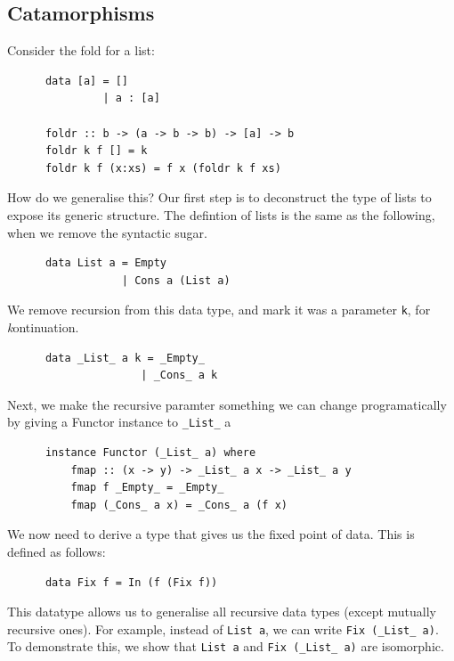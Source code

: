 \documentclass[a4paper,12pt]{article}
\theoremstyle{remark}
\begin{document}
  \subsection{Catamorphisms}

  Consider the fold for a list:

  \begin{lstlisting}
      data [a] = []
               | a : [a]

      foldr :: b -> (a -> b -> b) -> [a] -> b
      foldr k f [] = k
      foldr k f (x:xs) = f x (foldr k f xs)  \end{lstlisting}

  How do we generalise this? Our first step is to deconstruct the type of lists to expose its generic structure.
  The defintion of lists is the same as the following, when we remove the syntactic sugar.

  \begin{lstlisting}
      data List a = Empty
                  | Cons a (List a)  \end{lstlisting}

  We remove recursion from this data type, and mark it was a parameter \lstinline{k},
  for \textit{k}ontinuation.

  \begin{lstlisting}
      data _List_ a k = _Empty_
                     | _Cons_ a k  \end{lstlisting}

  Next, we make the recursive paramter something we can change programatically by
  giving a Functor instance to \lstinline{_List_} a

  \begin{lstlisting}
      instance Functor (_List_ a) where
          fmap :: (x -> y) -> _List_ a x -> _List_ a y
          fmap f _Empty_ = _Empty_
          fmap (_Cons_ a x) = _Cons_ a (f x)  \end{lstlisting}

  We now need to derive a type that gives us the fixed point of data. This is defined
  as follows:

  \begin{lstlisting}
      data Fix f = In (f (Fix f))  \end{lstlisting}

  This datatype allows us to generalise all recursive data types (except mutually
  recursive ones). For example, instead of \lstinline{List a}, we can write \lstinline{Fix (_List_ a)}. To
  demonstrate this, we show that \lstinline{List a} and \lstinline{Fix (_List_ a)} are isomorphic.
\end{document}
